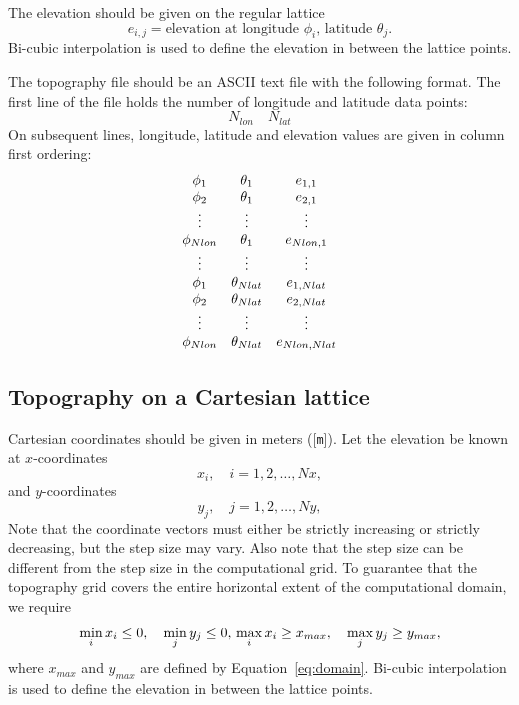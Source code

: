 \documentclass[11pt]{report}
\begin{document}
The elevation should be given on the regular lattice
\[
e_{i,j} = \mbox{elevation at longitude $\phi_i$, latitude $\theta_j$.}
\]
Bi-cubic interpolation is used to define the elevation in between the lattice points.

The topography file should be an ASCII text file with the following format. The first line of the
file holds the number of longitude and latitude data points:
\[
N_{lon}\quad N_{lat}
\]
On subsequent lines, longitude, latitude and elevation values are given in column first ordering:
\[
\begin{array}{c c c}
\phi_1 & \theta_1& e_{1,1}\\
\phi_2& \theta_1& e_{2,1}\\
\vdots&\vdots&\vdots\\
\phi_{Nlon}& \theta_1& e_{Nlon,1}\\
\vdots&\vdots&\vdots\\
\phi_1 & \theta_{Nlat}& e_{1,Nlat}\\
\phi_2& \theta_{Nlat}& e_{2,Nlat}\\
\vdots&\vdots&\vdots\\
\phi_{Nlon}& \theta_{Nlat}& e_{Nlon,Nlat}
\end{array}
\]

\subsection{Topography on a Cartesian lattice}
Cartesian coordinates should be given in meters ([{\tt m}]). Let the elevation be known at $x$-coordinates
\[
x_i,\quad i=1,2,\ldots,Nx,
\]
and $y$-coordinates
\[
y_j,\quad j=1,2,\ldots,Ny,
\]
Note that the coordinate vectors must either be strictly increasing or strictly
decreasing, but the step size may vary. Also note that the step size can be different from the step
size in the computational grid. To guarantee that the topography grid covers the entire horizontal
extent of the computational domain, we require
\[
\min_i x_i \leq 0,\quad \min_j y_j \leq 0,\\
\max_i x_i \geq x_{max},\quad \max_j y_j \geq y_{max},
\] 
where $x_{max}$ and $y_{max}$ are defined by Equation~\eqref{eq:domain}. Bi-cubic interpolation is
used to define the elevation in between the lattice points.
\end{document}
